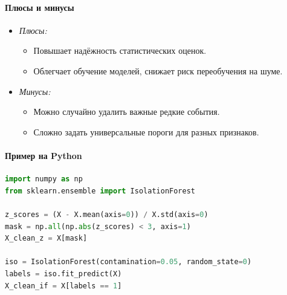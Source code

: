 \paragraph{Плюсы и минусы}
\begin{itemize}
  \item \emph{Плюсы:}  
    \begin{itemize}
      \item Повышает надёжность статистических оценок.  
      \item Облегчает обучение моделей, снижает риск переобучения на шуме.
    \end{itemize}
  \item \emph{Минусы:}  
    \begin{itemize}
      \item Можно случайно удалить важные редкие события.  
      \item Сложно задать универсальные пороги для разных признаков.
    \end{itemize}
\end{itemize}

\paragraph{Пример на Python}
\begin{lstlisting}[language=Python]
import numpy as np
from sklearn.ensemble import IsolationForest

z_scores = (X - X.mean(axis=0)) / X.std(axis=0)
mask = np.all(np.abs(z_scores) < 3, axis=1)
X_clean_z = X[mask]

iso = IsolationForest(contamination=0.05, random_state=0)
labels = iso.fit_predict(X)
X_clean_if = X[labels == 1]
\end{lstlisting}

%
